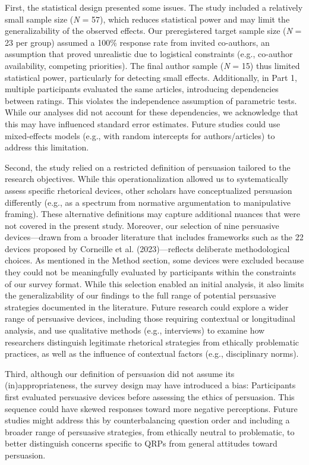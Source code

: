 \documentclass[authordate, meta]{jote-new-article}
\begin{document}
	First, the statistical design presented some issues. The study included a relatively small sample size (\emph{N }= 57), which reduces statistical power and may limit the generalizability of the observed effects. Our preregistered target sample size (\emph{N} = 23 per group) assumed a 100\% response rate from invited co-authors, an assumption that proved unrealistic due to logistical constraints (e.g., co-author availability, competing priorities). The final author sample (\emph{N} = 15) thus limited statistical power, particularly for detecting small effects. Additionally, in Part 1, multiple participants evaluated the same articles, introducing dependencies between ratings. This violates the independence assumption of parametric tests. While our analyses did not account for these dependencies, we acknowledge that this may have influenced standard error estimates. Future studies could use mixed-effects models (e.g., with random intercepts for authors/articles) to address this limitation.



	Second, the study relied on a restricted definition of persuasion tailored to the research objectives. While this operationalization allowed us to systematically assess specific rhetorical devices, other scholars have conceptualized persuasion differently (e.g., as a spectrum from normative argumentation to manipulative framing). These alternative definitions may capture additional nuances that were not covered in the present study. Moreover, our selection of nine persuasive devices—drawn from a broader literature that includes frameworks such as the 22 devices proposed by Corneille et al. (2023)—reflects deliberate methodological choices. As mentioned in the Method section, some devices were excluded because they could not be meaningfully evaluated by participants within the constraints of our survey format. While this selection enabled an initial analysis, it also limits the generalizability of our findings to the full range of potential persuasive strategies documented in the literature. Future research could explore a wider range of persuasive devices, including those requiring contextual or longitudinal analysis, and use qualitative methods (e.g., interviews) to examine how researchers distinguish legitimate rhetorical strategies from ethically problematic practices, as well as the influence of contextual factors (e.g., disciplinary norms).



	Third, although our definition of persuasion did not assume its (in)appropriateness, the survey design may have introduced a bias: Participants first evaluated persuasive devices before assessing the ethics of persuasion. This sequence could have skewed responses toward more negative perceptions. Future studies might address this by counterbalancing question order and including a broader range of persuasive strategies, from ethically neutral to problematic, to better distinguish concerns specific to QRPs from general attitudes toward persuasion.
\end{document}
